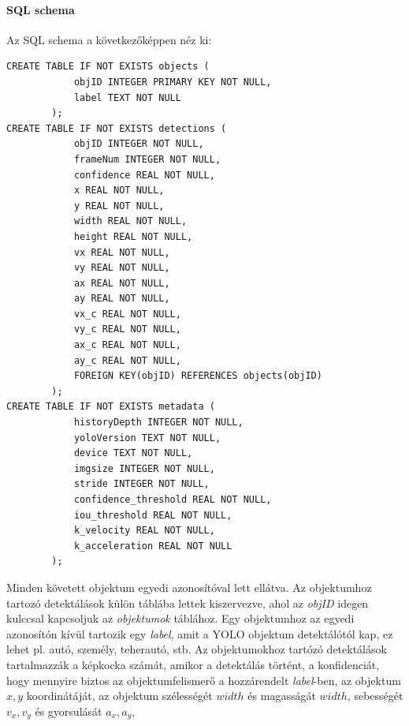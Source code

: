 \documentclass[12pt,a4paper]{article}
\begin{document}
\paragraph{SQL schema} Az SQL schema a következőképpen néz ki:
\begin{verbatim}
CREATE TABLE IF NOT EXISTS objects (
            objID INTEGER PRIMARY KEY NOT NULL,
            label TEXT NOT NULL
        );
CREATE TABLE IF NOT EXISTS detections (
            objID INTEGER NOT NULL,
            frameNum INTEGER NOT NULL,
            confidence REAL NOT NULL,
            x REAL NOT NULL,
            y REAL NOT NULL,
            width REAL NOT NULL,
            height REAL NOT NULL,
            vx REAL NOT NULL,
            vy REAL NOT NULL,
            ax REAL NOT NULL,
            ay REAL NOT NULL,
            vx_c REAL NOT NULL,
            vy_c REAL NOT NULL,
            ax_c REAL NOT NULL,
            ay_c REAL NOT NULL,
            FOREIGN KEY(objID) REFERENCES objects(objID)
        );
CREATE TABLE IF NOT EXISTS metadata (
            historyDepth INTEGER NOT NULL,
            yoloVersion TEXT NOT NULL,   
            device TEXT NOT NULL,
            imgsize INTEGER NOT NULL,
            stride INTEGER NOT NULL,
            confidence_threshold REAL NOT NULL,
            iou_threshold REAL NOT NULL,
            k_velocity REAL NOT NULL,
            k_acceleration REAL NOT NULL
        );
\end{verbatim}
Minden követett objektum egyedi azonosítóval lett ellátva. Az objektumhoz tartozó detektálások külön táblába lettek kiszervezve,
ahol az \textit{objID} idegen kulccsal kapcsoljuk az \textit{objektumok} táblához. Egy objektumhoz az egyedi azonosítón kívül
tartozik egy \textit{label}, amit a YOLO objektum detektálótól kap, ez lehet pl. autó, személy, teherautó, stb. Az objektumokhoz
tartózó detektálások tartalmazzák a képkocka számát, amikor a detektálás történt, a konfidenciát, hogy mennyire biztos az
objektumfelismerő a hozzárendelt \textit{label}-ben, az objektum \begin{math}x,y\end{math} koordinátáját, az objektum szélességét
\begin{math}width\end{math} és magasságát \begin{math}width\end{math}, sebességét \begin{math}v_x,v_y\end{math} és gyorsulását \begin{math}a_x,a_y\end{math},
\end{document}

